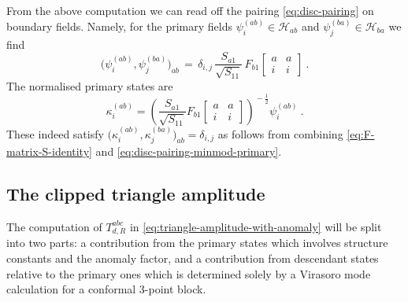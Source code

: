 \documentclass[11pt,a4paper]{article}
\numberwithin{equation}{section}
\begin{document}
From the above computation we can read off the pairing \eqref{eq:disc-pairing} on boundary fields. Namely, for the primary fields $\psi_i^{(ab)} \in \mathcal{H}_{ab}$ and $\psi_j^{(ba)} \in \mathcal{H}_{ba}$ we find
\begin{equation}\label{eq:disc-pairing-minmod-primary}
\big(\psi_i^{(ab)},\psi_j^{(ba)}\big)_{ab} \,=\, \delta_{i,j} 
     \, \frac{S_{a1}}{\sqrt{S_{11}}} \,
    F_{b1}\!\begin{bmatrix}a & a \\i & i\end{bmatrix} \ .
\end{equation}
%
The normalised primary states are
%
\begin{equation}\label{eq:normState}
    \kappa_i^{(ab)} 
    = 
    \left(\frac{S_{a1}}{\sqrt{S_{11}}} 
    F_{b1}\!\begin{bmatrix}a & a \\i & i\end{bmatrix} \right)^{\!-\frac{1}{2}}
    \psi_i^{(ab)}
    \ .
\end{equation}
These indeed satisfy $\big(\kappa_i^{(ab)},\kappa_j^{(ba)}\big)_{ab} = \delta_{i,j}$ as follows from combining \eqref{eq:F-matrix-S-identity} and \eqref{eq:disc-pairing-minmod-primary}.

\subsection{The clipped triangle amplitude}\label{sec:clipped-amplitude}

The computation of $T_{d,R}^{abc}$ in \eqref{eq:triangle-amplitude-with-anomaly} will be split into two parts: a contribution from the primary states which involves structure constants and the anomaly factor, and a contribution from descendant states relative to the primary ones which is determined solely by a Virasoro mode calculation for a conformal 3-point block.
\end{document}
